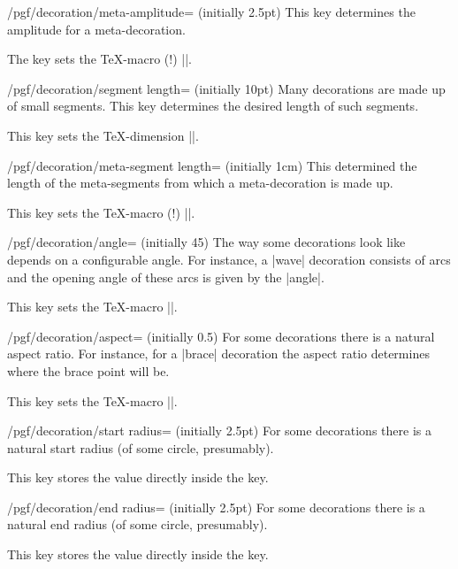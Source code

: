 \begin{key}{/pgf/decoration/meta-amplitude= (initially 2.5pt)}
    This key determines the amplitude for a meta-decoration.

    The key sets the \TeX-macro (!) |\pgfmetadecorationsegmentamplitude|.
\end{key}

\begin{key}{/pgf/decoration/segment length= (initially 10pt)}
    Many decorations are made up of small segments. This key determines the
    desired length of such segments.

    This key sets the \TeX-dimension |\pgfdecorationsegmentlength|.
\end{key}

\begin{key}{/pgf/decoration/meta-segment length= (initially 1cm)}
    This determined the length of the meta-segments from which a
    meta-decoration is made up.

    This key sets the \TeX-macro (!) |\pgfmetadecorationsegmentlength|.
\end{key}

\begin{key}{/pgf/decoration/angle= (initially 45)}
    The way some decorations look like depends on a configurable angle. For
    instance, a |wave| decoration consists of arcs and the opening angle of
    these arcs is given by the |angle|.

    This key sets the \TeX-macro |\pgfdecorationsegmentangle|.
\end{key}

\begin{key}{/pgf/decoration/aspect= (initially 0.5)}
    For some decorations there is a natural aspect ratio. For instance,
    for a |brace| decoration the aspect ratio determines where the brace
    point will be.

    This key sets the \TeX-macro |\pgfdecorationsegmentaspect|.
\end{key}

\begin{key}{/pgf/decoration/start radius= (initially 2.5pt)}
    For some decorations there is a natural start radius (of some circle,
    presumably).

    This key stores the value directly inside the key.
\end{key}

\begin{key}{/pgf/decoration/end radius= (initially 2.5pt)}
    For some decorations there is a natural end radius (of some circle,
    presumably).

    This key stores the value directly inside the key.
\end{key}

